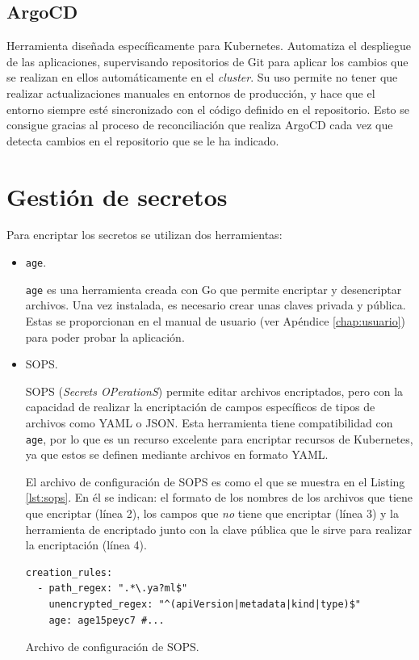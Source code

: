 \subsection*{ArgoCD}
\label{tech:argocd}

Herramienta diseñada específicamente para Kubernetes. Automatiza el despliegue de las aplicaciones, supervisando repositorios de Git para aplicar los cambios que se realizan en ellos automáticamente en el \textit{cluster}. Su uso permite no tener que realizar actualizaciones manuales en entornos de producción, y hace que el entorno siempre esté sincronizado con el código definido en el repositorio. Esto se consigue gracias al proceso de reconciliación que realiza ArgoCD cada vez que detecta cambios en el repositorio que se le ha indicado.

\clearpage

\section{Gestión de secretos}
\label{sec:secrets}

Para encriptar los secretos se utilizan dos herramientas:

\begin{itemize}
  \item \texttt{age}\cite{age}.

    \texttt{age} es una herramienta creada con Go que permite encriptar y desencriptar archivos. Una vez instalada, es necesario crear unas claves privada y pública. Estas se proporcionan en el manual de usuario (ver Apéndice \ref{chap:usuario}) para poder probar la aplicación.
  \item SOPS\cite{sops}.

    SOPS (\textit{Secrets OPerationS}) permite editar archivos encriptados, pero con la capacidad de realizar la encriptación de campos específicos de tipos de archivos como YAML o JSON. Esta herramienta tiene compatibilidad con \texttt{age}, por lo que es un recurso excelente para encriptar recursos de Kubernetes, ya que estos se definen mediante archivos en formato YAML.

    El archivo de configuración de SOPS es como el que se muestra en el Listing \ref{lst:sops}. En él se indican: el formato de los nombres de los archivos que tiene que encriptar (línea 2), los campos que \textit{no} tiene que encriptar (línea 3) y la herramienta de encriptado junto con la clave pública que le sirve para realizar la encriptación (línea 4).

\begin{listing}[!ht]
  \begin{verbatim}
creation_rules:
  - path_regex: ".*\.ya?ml$"
    unencrypted_regex: "^(apiVersion|metadata|kind|type)$"
    age: age15peyc7 #...
  \end{verbatim}
  \caption{Archivo de configuración de SOPS.}
  \label{lst:sops}
\end{listing}

\end{itemize}

